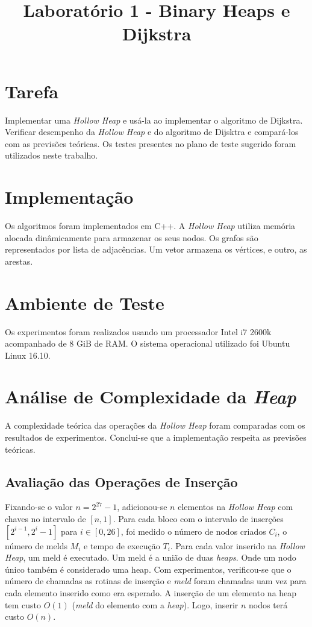 \documentclass{iiufrgs}
\title{Laboratório 1 - Binary Heaps e Dijkstra}
\author{}{Thiago Bell}
\begin{document}
\maketitle

\setcounter{chapter}{1}

\section{Tarefa}
Implementar uma \textit{Hollow Heap} e usá-la ao implementar o algoritmo de Dijkstra. 
Verificar desempenho da \textit{Hollow Heap} e do algoritmo de Dijsktra e compará-los com as previs\~oes teóricas.
Os testes presentes no plano de teste sugerido foram utilizados neste trabalho.

\section{Implementaç\~ao}
Os algoritmos foram implementados em C++. A \textit{Hollow Heap} utiliza memória alocada dinâmicamente para armazenar os seus nodos.
Os grafos s\~ao representados por lista de adjacências. Um vetor armazena os vértices, e outro, as arestas.

\section{Ambiente de Teste}
Os experimentos foram realizados usando um processador Intel i7 2600k acompanhado de 8 GiB de RAM. 
O sistema operacional utilizado foi Ubuntu Linux 16.10.

\section{Análise de Complexidade da \textit{Heap}}
A complexidade teórica das operaç\~oes da \textit{Hollow Heap} foram comparadas com os resultados de experimentos.
Conclui-se que a implementaç\~ao respeita as previs\~oes teóricas.

\subsection{Avaliaç\~ao das Operaç\~oes de Inserç\~ao}
Fixando-se o valor $n = 2^{27}-1$, adicionou-se $n$ elementos na \textit{Hollow Heap} com chaves no intervalo de $[n,1]$.
Para cada bloco com o intervalo de inserções $[2^{i-1},2^i - 1]$ para $i \in [0,26]$, foi medido o número de nodos criados
$C_i$, o número de melds $M_i$ e tempo de execução $T_i$. Para cada valor inserido na \textit{Hollow Heap}, um meld é executado.
Um meld é a união de duas \textit{heaps}. Onde um nodo único também é considerado uma heap. Com experimentos, verificou-se que 
o número de chamadas as rotinas de inserção e \textit{meld} foram chamadas uam vez para cada elemento inserido como era esperado.
A inserção de um elemento na heap tem custo $O(1)$ (\textit{meld} do elemento com a \textit{heap}). Logo, inserir $n$ nodos 
terá custo $O(n)$.	
\end{document}
